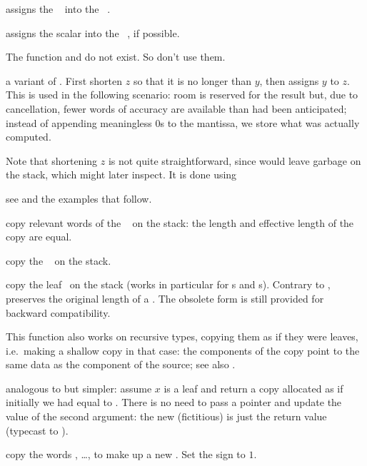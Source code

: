  assigns the ~ into the
~.

 assigns the scalar  into the
~, if possible.

\noindent The function  and  do not exist. So don't use
them.

 a variant of . First shorten
$z$ so that it is no longer than $y$, then assigns $y$ to $z$. This is used
in the following scenario: room is reserved for the result but, due to
cancellation, fewer words of accuracy are available than had been
anticipated; instead of appending meaningless $0$s to the mantissa, we store
what was actually computed.

Note that shortening $z$ is not quite straightforward, since 
would leave garbage on the stack, which  might later inspect.
It is done using

 see  and the examples that
follow.


 copy relevant words of the ~ on the
stack: the length and effective length of the copy are equal.

 copy the ~ on the stack.

 copy the leaf~ on the
stack (works in particular for s and s).
Contrary to ,  preserves the original
length of a . The obsolete form 
is still provided for backward compatibility.

This function also works on recursive types, copying them as if they were
leaves, i.e.~making a shallow copy in that case: the components of the copy
point to the same data as the component of the source; see also
.

 analogous to 
but simpler: assume $x$ is a leaf and return a copy allocated as if
initially we had  equal to . There is no need to pass a
pointer and update the value of the second argument: the new (fictitious)
 is just the return value (typecast to ).

 copy the  words
, \dots,  to make up a new . Set the sign
to $1$.

